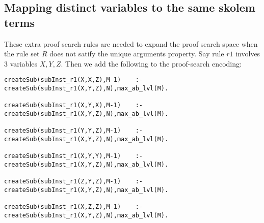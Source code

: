 \subsection{Mapping distinct variables to the same skolem terms}
These extra proof search rules are needed to expand the proof search space when the rule set $R$ does not satify the unique arguments property. Say rule $r1$ involves 3 variables $X, Y, Z$. Then we add the following to the proof-search encoding:
\begin{verbatim}
createSub(subInst_r1(X,X,Z),M-1)    :-createSub(subInst_r1(X,Y,Z),N),max_ab_lvl(M).

createSub(subInst_r1(X,Y,X),M-1)    :-createSub(subInst_r1(X,Y,Z),N),max_ab_lvl(M).

createSub(subInst_r1(Y,Y,Z),M-1)    :-createSub(subInst_r1(X,Y,Z),N),max_ab_lvl(M).

createSub(subInst_r1(X,Y,Y),M-1)    :-createSub(subInst_r1(X,Y,Z),N),max_ab_lvl(M).

createSub(subInst_r1(Z,Y,Z),M-1)    :-createSub(subInst_r1(X,Y,Z),N),max_ab_lvl(M).

createSub(subInst_r1(X,Z,Z),M-1)    :-createSub(subInst_r1(X,Y,Z),N),max_ab_lvl(M).
\end{verbatim}



